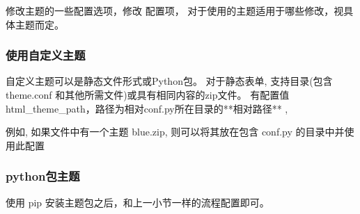 \documentclass[a4paper,10pt,english]{sphinxmanual}
\begin{document}
\begin{sphinxVerbatim}[commandchars=\\\{\}]
  
\end{sphinxVerbatim}

\sphinxAtStartPar
修改主题的一些配置选项，修改  配置项，
对于使用的主题适用于哪些修改，视具体主题而定。

\begin{sphinxVerbatim}[commandchars=\\\{\}]
  
  
  
\end{sphinxVerbatim}


\subsubsection{使用自定义主题}
\label{\detokenize{sphinx_conf:id14}}
\sphinxAtStartPar
自定义主题可以是静态文件形式或Python包。
对于静态表单, 支持目录(包含 theme.conf 和其他所需文件)或具有相同内容的zip文件。
有配置值 html\_theme\_path，路径为相对conf.py所在目录的**相对路径** ,

\sphinxAtStartPar
例如, 如果文件中有一个主题 blue.zip, 则可以将其放在包含 conf.py 的目录中并使用此配置

\begin{sphinxVerbatim}[commandchars=\\\{\}]
  
  \PYG{p}{[}\PYG{p}{]}
\end{sphinxVerbatim}


\subsubsection{python包主题}
\label{\detokenize{sphinx_conf:python}}
\sphinxAtStartPar
使用 pip 安装主题包之后，和上一小节一样的流程配置即可。

\begin{sphinxVerbatim}[commandchars=\\\{\}]
  
\end{sphinxVerbatim}
\end{document}
